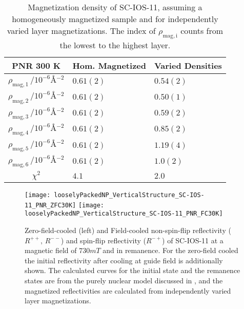 \documentclass[\main/dresen_thesis.tex]{subfiles}
\begin{document}
  \begin{table}[!htbp]
    \centering
    \caption{\label{tab:looselyPackedNP:layers:pnrSCIOS300K500mT}Magnetization density of SC-IOS-11, assuming a homogeneously magnetized sample and for independently varied layer magnetizations. The index of $\rho_\mathrm{mag, i}$ counts from the lowest to the highest layer.}
    \begin{tabular}{ c | l | l}
      \rule{0pt}{2ex} \textbf{PNR \@ 300 K}  & Hom. Magnetized & Varied Densities \\
      \hline
      $\rho_\mathrm{mag, 1} \, / \unit{10^{-6} \angstrom^{-2}} $    & $0.61(2)$ & $0.54(2)$\\
      $\rho_\mathrm{mag, 2} \, / \unit{10^{-6} \angstrom^{-2}} $    & $0.61(2)$ & $0.50(1)$\\
      $\rho_\mathrm{mag, 3} \, / \unit{10^{-6} \angstrom^{-2}} $    & $0.61(2)$ & $0.59(2)$\\
      $\rho_\mathrm{mag, 4} \, / \unit{10^{-6} \angstrom^{-2}} $    & $0.61(2)$ & $0.85(2)$\\
      $\rho_\mathrm{mag, 5} \, / \unit{10^{-6} \angstrom^{-2}} $    & $0.61(2)$ & $1.19(4)$\\
      $\rho_\mathrm{mag, 6} \, / \unit{10^{-6} \angstrom^{-2}} $    & $0.61(2)$ & $1.0(2)$\\
      \hline
      $\chi^2$                                                      & $4.1$     & $2.0$\\
      \hline
    \end{tabular}
  \end{table}


  \begin{figure}[tb]
    \centering
    \texttt{[image: looselyPackedNP\_VerticalStructure\_SC-IOS-11\_PNR\_ZFC30K]}
    \texttt{[image: looselyPackedNP\_VerticalStructure\_SC-IOS-11\_PNR\_FC30K]}
    \caption{\label{fig:looselyPackedNP:layer:pnrZFCFCIOS11}Zero-field-cooled (left) and Field-cooled non-spin-flip reflectivity ($R^{++},\,R^{--}$) and spin-flip reflectivity ($R^{-+}$) of SC-IOS-11 at a magnetic field of $730 \unit{mT}$ and in remanence. For the zero-field cooled the initial reflectivity after cooling at guide field is additionally shown. The calculated curves for the initial state and the remanence states are from the purely nuclear model discussed in , and the magnetized reflectivities are calculated from independently varied layer magnetizations.}
  \end{figure}
\end{document}
